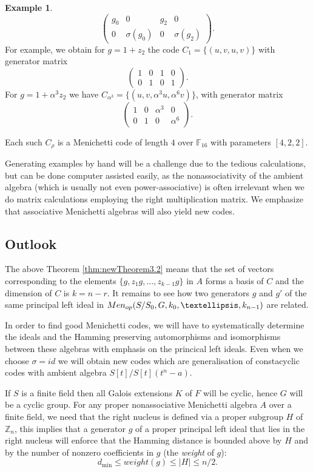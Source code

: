 \documentclass[11pt]{amsart}
\theoremstyle{plain}
\theoremstyle{definition}
\newtheorem{example}[theorem]{Example}
\begin{document}
\begin{example}
\[\begin{pmatrix}
      g_0 & 0 & g_2 & 0\\
      0 & \sigma(g_0) & 0 & \sigma(g_2)
    \end{pmatrix}.
\]
For example, we obtain for $g=1+z_2$ the code $C_1=\{(u,v,u,v)\}$ with generator matrix
        $$\begin{pmatrix}1&0&1&0\\0&1&0&1\end{pmatrix}.$$
        For $g=1+\alpha^{3}z_2$ we have $C_{\alpha^{3}}=\{(u,v,\alpha^{3}u,\alpha^{6}v)\}$, with
        generator matrix
        $$\begin{pmatrix}1&0&\alpha^{3}&0\\0&1&0&\alpha^{6}\end{pmatrix}.$$

Each such $C_\rho$ is a Menichetti code of length $4$ over $\mathbb F_{16}$ with parameters
$[4,2,2]$.
\end{example}


Generating examples by hand will be a challenge due to the tedious calculations, but can be done computer assisted easily, as the nonassociativity of the ambient algebra (which is usually not even power-associative) is often irrelevant when we do matrix calculations employing the right multiplication matrix. We emphasize that associative Menichetti algebras will also yield new codes.



\subsection{Outlook}

The above Theorem \ref{thm:newTheorem3.2} means that the set of vectors corresponding to the elements $ \{ g,z_1 g,\ldots,z_{k-1}g\} $ in $A$ forms a basis of $C$ and the dimension of $   C $ is $ k=n-r. $
It remains to see how two generators $g$ and $g'$ of the same principal left ideal in
${\rm Men}_{op}(S/S_0,G, k_0,\dots,k_{n-1})$ are related.


In order to find good Menichetti codes, we will have to systematically determine the ideals and the Hamming preserving automorphisms and isomorphisms between these algebras with emphasis on the princical left ideals. Even when we choose $\sigma=id$ we will obtain new codes which are  generalisation of constacyclic codes with ambient algebra $S[t]/S[t](t^n-a)$.

If $S$ is a finite field then all Galois extensions $K$ of $F$ will be cyclic, hence $G$ will be a cyclic group.
For any proper nonassociative Menichetti algebra $A$ over a finite field, we need that the right nucleus is defined via a proper subgroup $H$ of $\mathbb Z_n$, this implies that a generator $g$ of a proper principal left ideal that lies in the right nucleus will enforce that the Hamming distance is bounded above by $H$ and by the number of nonzero coefficients in $g$ (the \emph{weight} of $g$):
\[
  d_{\min}\leq weight(g)\leq |H|\leq n/2 .
\]
\end{document}
